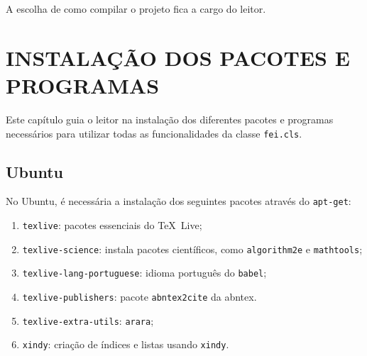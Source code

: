 \documentclass{fei}
\begin{document}
	A escolha de como compilar o projeto fica a cargo do leitor.	
	
	\chapter{INSTALAÇÃO DOS PACOTES E PROGRAMAS}	\label{chap:instalacao}
	
	Este capítulo guia o leitor na instalação dos diferentes pacotes e programas necessários para utilizar todas as funcionalidades da classe \texttt{fei.cls}.
	
	\section{Ubuntu}
	
	No Ubuntu, é necessária a instalação dos seguintes pacotes através do \texttt{apt-get}:
	
	\begin{enumerate}
	\item \texttt{texlive}: pacotes essenciais do \TeX~Live;
	\item \texttt{texlive-science}: instala pacotes científicos, como \texttt{algorithm2e} e \texttt{mathtools};
	\item \texttt{texlive-lang-portuguese}: idioma português do \texttt{babel};
	\item \texttt{texlive-publishers}: pacote \texttt{abntex2cite} da \gls{abntex}.
	\item \texttt{texlive-extra-utils}: \texttt{arara};
	\item \texttt{xindy}: criação de índices e listas usando \texttt{xindy}.
	\end{enumerate}
	

	\indice
	
\end{document}

